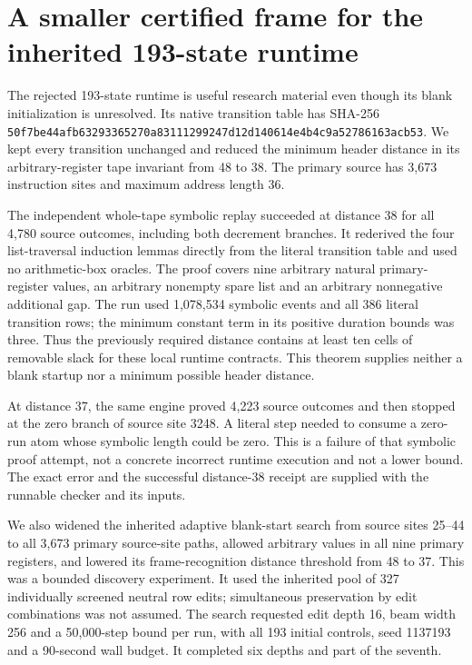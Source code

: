 \section{A smaller certified frame for the inherited 193-state runtime}
\label{sec:header-span-research}

The rejected 193-state runtime is useful research material even though its
blank initialization is unresolved. Its native transition table has SHA-256
\nolinkurl{50f7be44afb63293365270a83111299247d12d140614e4b4c9a52786163acb53}.
We kept every transition unchanged and reduced the minimum header distance
in its arbitrary-register tape invariant from 48 to 38. The primary source
has 3,673 instruction sites and maximum address length 36.

The independent whole-tape symbolic replay succeeded at distance 38 for all
4,780 source outcomes, including both decrement branches. It rederived the
four list-traversal induction lemmas directly from the literal transition
table and used no arithmetic-box oracles. The proof covers nine arbitrary
natural primary-register values, an arbitrary nonempty spare list and an
arbitrary nonnegative additional gap. The run used 1,078,534 symbolic
events and all 386 literal transition rows; the minimum constant term in
its positive duration bounds was three. Thus the previously required
distance contains at least ten cells of removable slack for these local
runtime contracts. This theorem supplies neither a blank startup nor a
minimum possible header distance.

At distance 37, the same engine proved 4,223 source outcomes and then
stopped at the zero branch of source site 3248. A literal step needed to
consume a zero-run atom whose symbolic length could be zero. This is a
failure of that symbolic proof attempt, not a concrete incorrect runtime
execution and not a lower bound. The exact error and the successful
distance-38 receipt are supplied with the runnable checker and its inputs.

We also widened the inherited adaptive blank-start search from source
sites 25--44 to all 3,673 primary source-site paths, allowed arbitrary
values in all nine primary registers, and lowered its frame-recognition
distance threshold from 48 to 37. This was a bounded discovery experiment.
It used the inherited pool of 327 individually screened neutral row edits;
simultaneous preservation by edit combinations was not assumed. The search
requested edit depth 16, beam width 256 and a 50,000-step bound per run,
with all 193 initial controls, seed 1137193 and a 90-second wall budget.
It completed six depths and part of the seventh.

